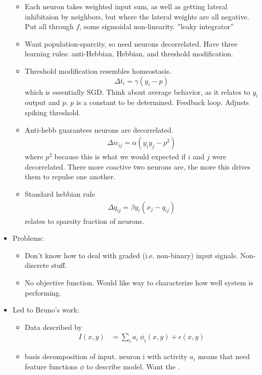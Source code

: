 \documentclass[12pt]{article}
\begin{document}
\begin{itemize}
\begin{itemize}
		\item Each neuron takes weighted input sum, as well as getting lateral inhibitaion by neighbors, but where the lateral weights are all negative. Put all through $f$, some sigmoidal non-linearity. ''leaky integrator''
		\item Want population-sparcity, so need neurons decorrelated. Have three learning rules: anti-Hebbian, Hebbian, and threshold modification.
		\item Threshold modification resembles homeostasis. 
		\begin{equation}
			\Delta t_i  = \gamma (y_i - p)
		\end{equation}
		which is essentially SGD. Think about average behavior, as it relates to $y_i$ output and $p$. $p$ is a constant to be determined. Feedback loop. Adjusts spiking threshold. 
		\item Anti-hebb guarantees neurons are decorrelated. 
		\begin{align}
			\Delta w_{ij} = \alpha (y_i y_j - p^2)
		\end{align}
		where $p^2$ because this is what we would expected if $i$ and $j$ were decorrelated. There more coactive two neurons are, the more this drives them to repulse one another. 
		\item Standard hebbian rule
		\begin{align}
			\Delta q_{ij} = \beta y_i (x_j - q_{ij})
		\end{align}
		relates to sparsity fraction of neurons. 
	\end{itemize}
	\item Problems:
	\begin{itemize}
		\item Don't know how to deal with graded (i.e. non-binary) input signals. Non-discrete stuff. 
		\item No objective function. Would like way to characterize how well system is performing. 
	\end{itemize}
	\item Led to Bruno's work: 
	\begin{itemize}
		\item Data described by
		\begin{align}
			I(x, y) &= \sum_i a_i ~ \phi_i(x, y) + \epsilon(x, y)
		\end{align}
		\item basis decomposition of input. neuron i with activity $a_i$ means that need feature functions $\phi$ to describe model. Want the . 

\end{itemize}
\end{itemize}
\end{document}
